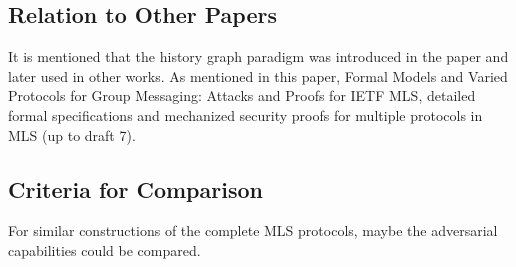 \subsection{Relation to Other Papers}

It is mentioned that the history graph paradigm was introduced in the paper and later used in other works. As mentioned in this paper, Formal Models and Varied Protocols for Group Messaging: Attacks and Proofs for IETF MLS, detailed formal specifications and mechanized security proofs for multiple protocols in MLS (up to draft 7).


\subsection{Criteria for Comparison}

For similar constructions of the complete MLS protocols, maybe the adversarial  capabilities could be compared. 
